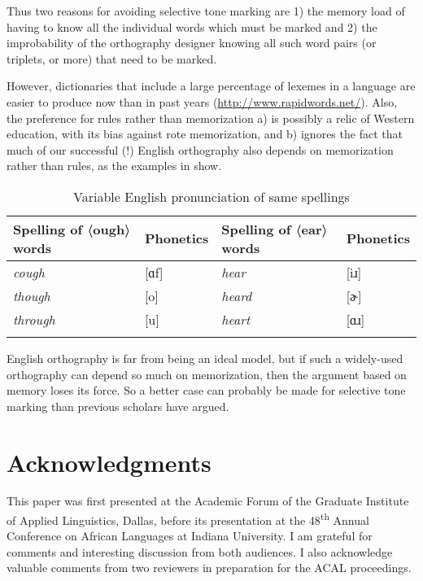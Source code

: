 \documentclass[output=paper]{langscibook}
\begin{document}
Thus two reasons for avoiding selective tone marking are 1) the memory load of having to know all the individual words which must be marked and 2) the improbability of the orthography designer knowing all such word pairs (or triplets, or more) that need to be marked.

However, dictionaries that include a large percentage of lexemes in a language are easier to produce now than in past years (\url{http://www.rapidwords.net/}). Also, the preference for rules rather than memorization a) is possibly a relic of Western education, with its bias against rote memorization, and b) ignores the fact that much of our successful (!) English orthography also depends on memorization rather than rules, as the examples in  show.

\begin{table}
    \begin{tabular}{llll}
        \lsptoprule
        Spelling of 〈ough〉 words & Phonetics &  Spelling of 〈ear〉 words & Phonetics\\
        \midrule
        \textit{cough} & [ɑf] &  \textit{hear} & [iɹ]\\
        \textit{though} & [o] &  \textit{heard} & [ɚ]\\
        \textit{through} & [u] &  \textit{heart} & [ɑɹ]\\
        \lspbottomrule
    \end{tabular}
    \caption{Variable English pronunciation of same spellings}
    \label{tab:VariableEnglishPronunciation}
\end{table}

English orthography is far from being an ideal model, but if such a widely-used orthography can depend so much on memorization, then the argument based on memory loses its force. So a better case can probably be made for selective tone marking than previous scholars have argued.

\section*{Acknowledgments}
This paper was first presented at the Academic Forum of the Graduate Institute of Applied Linguistics, Dallas, before its presentation at the 48\textsuperscript{th} Annual Conference on African Languages at Indiana University. I am grateful for comments and interesting discussion from both audiences. I also acknowledge valuable comments from two reviewers in preparation for the ACAL proceedings.


{\sloppy\printbibliography[heading=subbibliography,notkeyword=this]}
\end{document}
